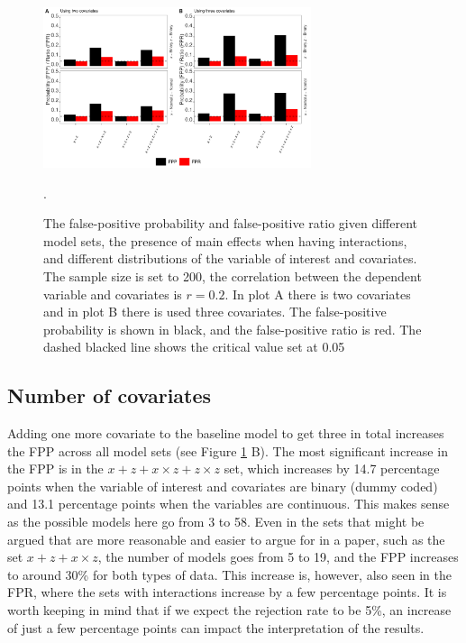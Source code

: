 \begin{figure}[hbt!]
\includegraphics[width=0.7\textwidth]{R/Analysis/Result/Figures/Figure1_paper.jpeg}
\centering
\caption{The false-positive probability and false-positive ratio given different model sets, the presence of main effects when having interactions, and different distributions of the variable of interest and covariates. The sample size is set to 200, the correlation between the dependent variable and covariates is $r=0.2$. In plot A there is two covariates and in plot B there is used three covariates. The false-positive probability is shown in black, and the false-positive ratio is red. The dashed blacked line shows the critical value set at 0.05 }.
\label{fig:mainfigure1}
\end{figure}

\subsection{Number of covariates}
Adding one more covariate to the baseline model to get three in total increases the FPP across all model sets (see Figure \ref{fig:mainfigure1} B).  The most significant increase in the FPP is in the $x + z+ x \times z + z \times z$ set, which increases by 14.7 percentage points when the variable of interest and covariates are binary (dummy coded) and 13.1 percentage points when the variables are continuous. This makes sense as the possible models here go from 3 to 58. Even in the sets that might be argued that are more reasonable and easier to argue for in a paper, such as the set $x + z+ x \times z $, the number of models goes from 5 to 19, and the FPP increases to around 30\% for both types of data. This increase is, however, also seen in the FPR, where the sets with interactions increase by a few percentage points. It is worth keeping in mind that if we expect the rejection rate to be 5\%, an increase of just a few percentage points can impact the interpretation of the results.  



